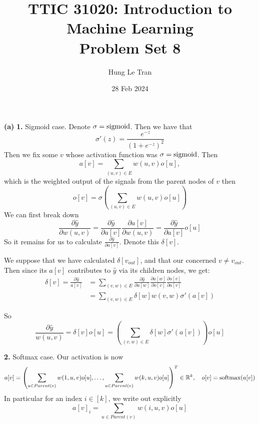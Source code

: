 \documentclass[a4paper, 10pt]{article}
\title{TTIC 31020: Introduction to Machine Learning \\ \large Problem Set 8}
\date{28 Feb 2024}
\author{Hung Le Tran}
\begin{document}
\maketitle
\setcounter{section}{8}
\begin{problem} 
\textbf{(a)} 
\textbf{1.} Sigmoid case. Denote $\sigma = \mathrm{sigmoid}$. Then we have that \begin{equation*}
\sigma'(z) = \frac{e^{-z}}{(1 + e^{-z})^2}
\end{equation*}
Then we fix some $v$ whose activation function was $\sigma = \mathrm{sigmoid}$. Then
\begin{equation*}
a[v] = \sum_{(u, v) \in E} w(u, v) o[u],
\end{equation*}
which is the weighted output of the signals from the parent nodes of $v$ then
\begin{equation*}
o[v] = \sigma\left(\sum_{(u, v) \in E} w(u, v) o[u]\right)
\end{equation*}
We can first break down \begin{equation*}
\frac{\partial \hat{y}}{\partial w(u, v)} = \frac{\partial \hat{y}}{\partial a[v]} \frac{\partial a[v]}{\partial w(u, v)} = \frac{\partial \hat{y}}{\partial a[v]} o[u]
\end{equation*}
So it remains for us to calculate $\frac{\partial \hat{y}}{\partial a[v]}$. Denote this $\delta[v]$.

We suppose that we have calculated $\delta[v_{out}]$, and that our concerned $v \neq v_{out}$. Then since its $a[v]$ contributes to $\hat{y}$ via its children nodes, we get:
\begin{align*}
\delta[v] = \frac{\partial \hat{y}}{a[v]} &= \sum_{(v, w) \in E} \frac{\partial \hat{y}}{\partial a[w]} \frac{\partial a[w]}{\partial o[v]} \frac{\partial o[v]}{\partial a[v]}   \\
&= \sum_{(v, w) \in E} \delta[w] w(v, w) \sigma'(a[v])
\end{align*}

So \begin{equation*}
\frac{\partial \hat{y}}{w(u, v)} =\delta[v] o[u] = \left(\sum_{(v, w) \in E} \delta[w] \sigma'(a[v])\right) o[u]
\end{equation*}
\end{problem}

\textbf{2.} Softmax case. Our activation is now \begin{equation*}
a[v] = \left(\sum_{u \in Parent(v)}w(1, u, v) o[u], \ldots, \sum_{u \in Parent(v)} w(k, u, v) o[u]\right)^T \in \mathbb{R}^k, \quad o[v] = \mathrm{softmax} (a[v])
\end{equation*}
In particular for an index $i \in [k]$, we write out explicitly
\begin{equation*}
a[v]_i = \sum_{u \in Parent(v)} w(i, u, v) o[u]
\end{equation*}
\end{document}
